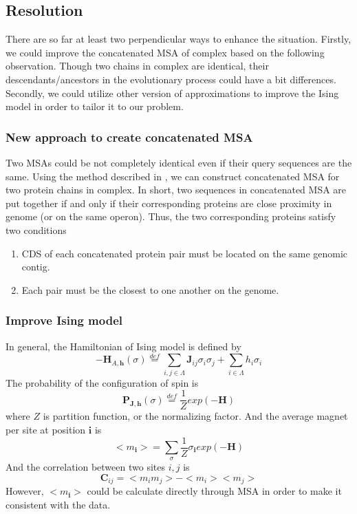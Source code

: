 \documentclass[a4paper,12pt]{article}
\begin{document}
\subsection*{Resolution}
There are so far at least two perpendicular ways to enhance the situation. Firstly, we could improve the concatenated MSA of complex based on the following observation. Though two chains in complex are identical, their descendants/ancestors in the evolutionary process could have a bit differences. Secondly, we could utilize other version of approximations to improve the Ising model in order to tailor it to our problem. 
\subsubsection*{New approach to create concatenated MSA}

Two MSAs could be not completely identical even if their query sequences are the same. Using the method described in \cite{Hopf2014}, we can construct concatenated MSA for two protein chains in complex. In short, two sequences in concatenated MSA are put together if and only if their corresponding proteins are close proximity in genome (or on the same operon). Thus, the two corresponding proteins satisfy two conditions

\begin{enumerate}
\item
CDS of each concatenated protein pair must be located on the same genomic contig.
\item
Each pair must be the closest to one another on the genome.
\end{enumerate}

\subsubsection*{Improve Ising model}

In general, the Hamiltonian of Ising model is defined by
\begin{equation} \label{eq1}
 -\mathbf{H}_{A,\textbf{h}}(\sigma) \stackrel{def}{=}  \sum_{i,j \in \Lambda} \mathbf{J}_{ij}\sigma_i \sigma_j + \sum_{i \in \Lambda} h_i \sigma_i 
\end{equation}
The probability of the configuration of spin is
\begin{equation} \label{eq2}
 \mathbf{P}_{\mathbf{J},\textbf{h}}(\sigma) \stackrel{def}{=}  \frac{1}{Z}exp(-\mathbf{H}) 
\end{equation}
where $ Z $ is partition function, or the normalizing factor.
And the average magnet per site at position $ \textbf{i} $ is
\begin{equation} \label{eq3}
<m_\textbf{i}> = \sum_\sigma{\frac{1}{Z}\sigma_\textbf{i}exp(-\mathbf{H})}
\end{equation}
And the correlation between two sites $ i,j $ is
\begin{equation}\label{eq4}
 \mathbf{C}_{ij}=<m_im_j> - <m_i><m_j>
\end{equation}
However, $ <m_\textbf{i}> $ could be calculate directly through MSA in order to make it consistent with the data.
\end{document}

